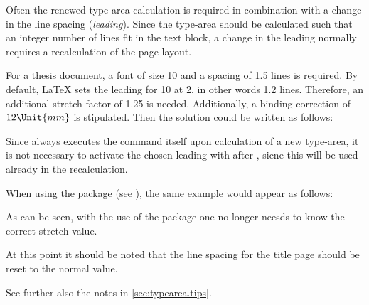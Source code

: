 Often the renewed type-area calculation is required in combination
with a change in the line spacing
(\emph{leading}). Since the type-area should be
calculated such that an integer number of lines fit in the text block,
a change in the leading normally requires a recalculation of the page
layout.
 
\begin{Example}
  For a thesis document, a font of size 10 and a spacing of
  1.5 lines is required. By default, {\LaTeX} sets the leading for
  10 at 2, in other words 1.2 lines. Therefore, an
  additional stretch factor of 1.25 is needed. Additionally, a binding
  correction of \(12\Unit{mm}\) is stipulated. Then the solution could be
  written as follows:
Since  always executes the command
 itself upon calculation of a new type-area, it is
not necessary to activate the chosen leading with 
after , sicne this will be used already in the
recalculation.

When using the  package (see
\cite{package:setspace}), the same example would appear as follows:
As can be seen, with the use of the  package one no
longer neesds to know the correct stretch value.

At this point it should be noted that the line spacing for the title
page should be reset to the normal value.
\iffalse%
  A complete example would be:
\fi
{}
  See further also the notes in \autoref{sec:typearea.tips}.
\end{Example}

